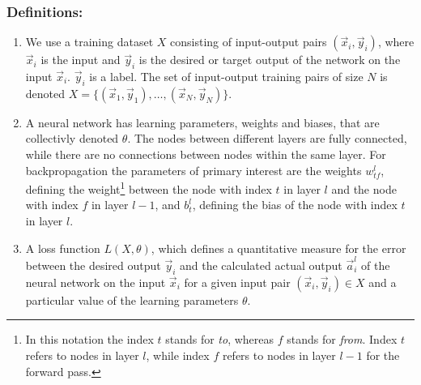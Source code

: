 \subsubsection*{Definitions:}
\begin{enumerate}
    \item We use a training dataset $X$ consisting of input-output pairs $(\vec{x}_i,
    \vec{y}_i)$, where $\vec{x}_i$ is the input and $\vec{y}_i$ is the desired or target
    output of the network on the input $\vec{x}_i$. $\vec{y}_i$ is a label. The set of
    input-output training pairs of size $N$ is denoted $X = \{(\vec{x}_1,\vec{y}_1),
    \dots, (\vec{x}_N,\vec{y}_N)\}$.

    \item A neural network has learning parameters, weights and biases, that are
    collectivly denoted $\theta$. The nodes between different layers are fully connected,
    while there are no connections between nodes within the same layer. For
    backpropagation the parameters of primary interest are the weights $w^l_{tf}$,
    defining the weight\footnote{In this notation the index $t$ stands for \emph{to},
    whereas $f$ stands for \emph{from}. Index $t$ refers to nodes in layer $l$, while
    index $f$ refers to nodes in layer $l-1$ for the forward pass.} between the node with
    index $t$ in layer $l$ and the node with index $f$ in layer $l-1$, and $b^l_t$,
    defining the bias of the node with index $t$ in layer $l$. 

    \item A loss function $L(X,\theta)$, which defines a quantitative measure for the
    error between the desired output $\vec{y}_i$ and the calculated actual output
    $\vec{a}^l_i$ of the neural network on the input $\vec{x}_i$ for a given input pair
    $(\vec{x}_i, \vec{y}_i) \in X$ and a particular value of the learning parameters
    $\theta$.
\end{enumerate}

